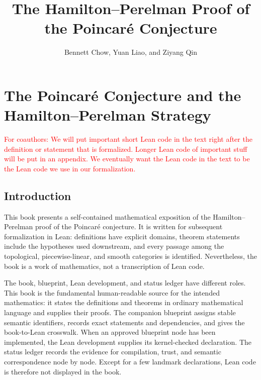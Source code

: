 \documentclass[10pt]{coll-l}
\theoremstyle{definition}
\theoremstyle{remark}
\numberwithin{section}{chapter}
\numberwithin{equation}{chapter}
\begin{document}
\frontmatter

\title{The Hamilton--Perelman Proof of the Poincar\'e Conjecture}
\author{Bennett Chow, Yuan Liao, and Ziyang Qin}
\date{}


\maketitle

\setcounter{page}{5}
\setcounter{chapter}{0}

\tableofcontents



\mainmatter

\chapter[Poincar\'e proof strategy]
{The Poincar\'e Conjecture and the Hamilton--Perelman Strategy}
\label{ch:architecture}

\textcolor{red}{For coauthors: We will put important short Lean code in the text right after the definition or statement that is formalized. Longer Lean code of important stuff will be put in an appendix. We eventually want the Lean code in the text to be the Lean code we use in our formalization.}

\section{Introduction}

This book presents a self-contained mathematical exposition of the
Hamilton--Perelman proof of the Poincar\'e conjecture.  It is written for
subsequent formalization in Lean: definitions have explicit domains, theorem
statements include the hypotheses used downstream, and every passage among
the topological, piecewise-linear, and smooth categories is identified.
Nevertheless, the book is a work of mathematics, not a transcription of Lean
code.

The book, blueprint, Lean development, and status ledger have different
roles.  This book is the fundamental human-readable source for the intended
mathematics: it states the definitions and theorems in ordinary mathematical
language and supplies their proofs.  The companion blueprint assigns stable
semantic identifiers, records exact statements and dependencies, and gives
the book-to-Lean crosswalk.  When an approved blueprint node has been
implemented, the Lean development supplies its kernel-checked declaration.
The status ledger records the evidence for compilation, trust, and semantic
correspondence node by node.  Except for a few landmark declarations, Lean
code is therefore not displayed in the book.
\end{document}
